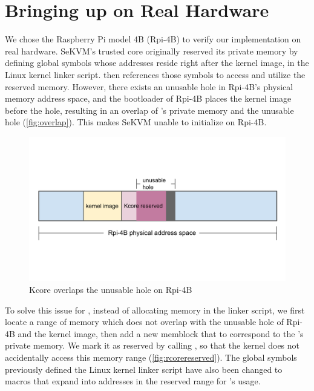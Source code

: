 \section{Bringing up \rustsec{} on Real Hardware}

We chose the Raspberry Pi model 4B (Rpi-4B) to verify our implementation on
real hardware.
SeKVM's trusted core \secore{} originally reserved its private memory by
defining global symbols whose addresses reside right after the kernel image,
in the Linux kernel linker script.
\secore{} then references those symbols to access and utilize the reserved
memory.
However, there exists an unusable hole in Rpi-4B's physical memory address
space, and the bootloader of Rpi-4B places the kernel image before the hole,
resulting in an overlap of \secore{}'s private memory and the unusable hole
(\autoref{fig:overlap}). This makes SeKVM unable to initialize on Rpi-4B.

\begin{figure}[hbtp]
    \includegraphics[scale=0.60]{figures/overlap.pdf}
    \caption{Kcore overlaps the unusable hole on Rpi-4B}
    \label{fig:overlap}
\end{figure}

To solve this issue for \rustsec{}, instead of allocating memory in the linker
script, we first locate a range of memory which does not overlap with the
unusable hole of Rpi-4B and the kernel image, then add a new memblock that to
correspond to the \rustcore{}'s private memory. We mark it as reserved by
calling , so that the kernel does not accidentally
access this memory range (\autoref{fig:rcorereserved}).
The global symbols previously defined the Linux kernel linker script have also
been changed to macros that expand into addresses in the reserved range for
\rustsec{}'s \rustcore{} usage.

